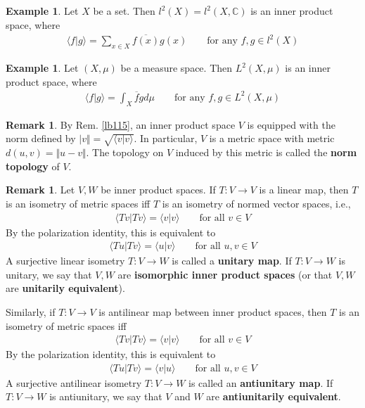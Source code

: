 \documentclass[12pt,b5paper,notitlepage]{article}
\theoremstyle{definition}
\newtheorem{eg}[df]{Example}
\newtheorem{rem}[df]{Remark}
\theoremstyle{plain}
\newcommand{\ovl}{\overline}
\newcommand{\bk}[1]{\langle {#1}\rangle}
\newcommand{\Cbb}{\mathbb C}
\newcommand{\hqed}{\hfill\qedsymbol}
\numberwithin{equation}{section}
\begin{document}
\begin{eg}
Let $X$ be a set. Then $l^2(X)=l^2(X,\Cbb)$ is an inner product space, where
\begin{align*}
\bk{f|g}=\sum_{x\in X} \ovl{f(x)}g(x)\qquad\text{for any }f,g\in l^2(X)
\end{align*} 
\end{eg}


\begin{eg}
Let $(X,\mu)$ be a measure space. Then $L^2(X,\mu)$ is an inner product space, where
\begin{align*}
\bk{f|g}=\int_X \ovl fgd\mu\qquad\text{for any }f,g\in L^2(X,\mu)
\end{align*}
\end{eg}


\begin{rem}
By Rem. \ref{lb115}, an inner product space $V$ is equipped with the norm defined by $\vert v\Vert=\sqrt{\bk{v|v}}$. In particular, $V$ is a metric space with metric $d(u,v)=\Vert u-v\Vert$. The topology on $V$ induced by this metric is called the \textbf{norm topology}  of $V$. 
\end{rem}

\begin{rem}
Let $V,W$ be inner product spaces. If $T:V\rightarrow V$ is a linear map, then $T$ is an isometry of metric spaces iff $T$ is an isometry of normed vector spaces, i.e., 
\begin{align*}
\bk{Tv|Tv}=\bk{v|v}\qquad \text{for all }v\in V
\end{align*}
By the polarization identity, this is equivalent to
\begin{align*}
\bk{Tu|Tv}=\bk{u|v}\qquad \text{for all }u,v\in V
\end{align*} 
A surjective linear isometry $T:V\rightarrow W$ is called a \textbf{unitary map}.  If $T:V\rightarrow W$ is unitary, we say that $V,W$ are \textbf{isomorphic inner product spaces} (or that $V,W$ are \textbf{unitarily equivalent}).  


Similarly, if $T:V\rightarrow V$ is antilinear map between inner product spaces, then $T$ is an isometry of metric spaces iff
\begin{align*}
\bk{Tv|Tv}=\bk{v|v}\qquad \text{for all }v\in V
\end{align*}
By the polarization identity, this is equivalent to
\begin{align*}
\bk{Tu|Tv}=\bk{v|u}\qquad \text{for all }u,v\in V
\end{align*}
A surjective antilinear isometry $T:V\rightarrow W$ is called an \textbf{antiunitary map}.  If $T:V\rightarrow W$ is antiunitary, we say that $V$ and $W$ are \textbf{antiunitarily equivalent}. \hqed
\end{rem}
\end{document}
